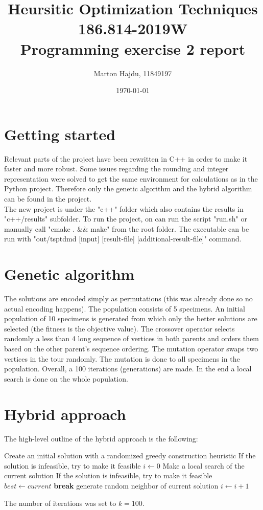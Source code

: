 \documentclass{article}
\title{Heursitic Optimization Techniques\\186.814-2019W\\Programming exercise 2 report}
\date{\today}
\author{Marton Hajdu, 11849197}
\begin{document}
\maketitle
\section*{Getting started}
Relevant parts of the project have been rewritten in C++ in order to make it faster and more robust. Some issues regarding the rounding and integer representation were solved to get the same environment for calculations as in the Python project. Therefore only the genetic algorithm and the hybrid algorithm can be found in the project.\medskip\\
The new project is under the "c++" folder which also contains the results in "c++/results" subfolder. To run the project, on can run the script "run.sh" or manually call "cmake . \&\& make" from the root folder. The executable can be run with "out/tsptdmd [input] [result-file] [additional-result-file]" command. 
\section*{Genetic algorithm}
The solutions are encoded simply as permutations (this was already done so no actual encoding happens). The population consists of 5 specimens. An initial population of 10 specimens is generated from which only the better solutions are selected (the fitness is the objective value). The crossover operator selects randomly a less than 4 long sequence of vertices in both parents and orders them based on the other parent's sequence ordering. The mutation operator swaps two vertices in the tour randomly. The mutation is done to all specimens in the population. Overall, a 100 iterations (generations) are made. In the end a local search is done on the whole population.
\section*{Hybrid approach}
The high-level outline of the hybrid approach is the following:
\begin{algorithmic}[1]
	\State Create an initial solution with a randomized greedy construction heuristic
	\State If the solution is infeasible, try to make it feasible
	\State $i \gets 0$
	\State Make a local search of the current solution
	\State If the solution is infeasible, try to make it feasible
	\State $best \gets current$
	\EndIf
	\State \textbf{break}
	\State generate random neighbor of current solution
	\State $i \gets i+1$
	\EndIf
	\EndWhile
\end{algorithmic}
The number of iterations was set to $k=100$.
\end{document}
